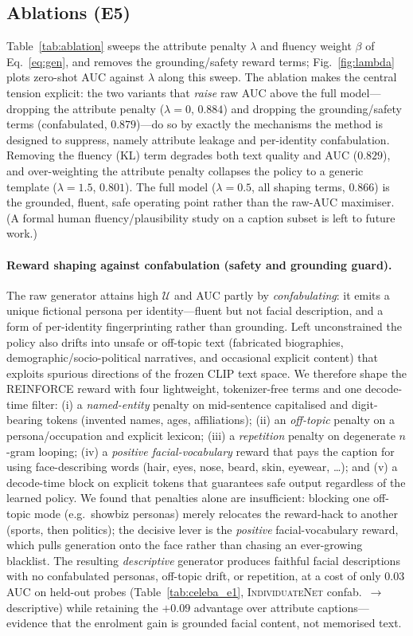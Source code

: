 \documentclass[10pt,twocolumn,letterpaper]{article}
\newcommand{\U}{\mathcal{U}}
\newcommand{\method}{\textsc{IndividuateNet}}
\begin{document}
\subsection{Ablations (E5)}
\label{sec:e5}
Table~\ref{tab:ablation} sweeps the attribute penalty $\lambda$ and fluency weight $\beta$ of
Eq.~\ref{eq:gen}, and removes the grounding/safety reward terms; Fig.~\ref{fig:lambda}
plots zero-shot AUC against $\lambda$ along this sweep. The ablation makes the central tension
explicit: the two variants that \emph{raise} raw AUC above the full model---dropping the
attribute penalty ($\lambda{=}0$, $0.884$) and dropping the grounding/safety terms
(confabulated, $0.879$)---do so by exactly the mechanisms the method is designed to suppress,
namely attribute leakage and per-identity confabulation. Removing the fluency (KL) term degrades
both text quality and AUC ($0.829$), and over-weighting the attribute penalty collapses the
policy to a generic template ($\lambda{=}1.5$, $0.801$). The full model ($\lambda{=}0.5$, all
shaping terms, $0.866$) is the grounded, fluent, safe operating point rather than the raw-AUC
maximiser. (A formal human fluency/plausibility study on a caption subset is left to future work.)

\paragraph{Reward shaping against confabulation (safety and grounding guard).}
The raw generator attains high $\U$ and AUC partly by \emph{confabulating}: it emits a unique
fictional persona per identity---fluent but not facial description, and a form of per-identity
fingerprinting rather than grounding. Left unconstrained the policy also drifts into unsafe or
off-topic text (fabricated biographies, demographic/socio-political narratives, and occasional
explicit content) that exploits spurious directions of the frozen CLIP text space. We therefore
shape the REINFORCE reward with four lightweight, tokenizer-free terms and one decode-time
filter: (i) a \emph{named-entity} penalty on mid-sentence capitalised and digit-bearing tokens
(invented names, ages, affiliations); (ii) an \emph{off-topic} penalty on a persona/occupation
and explicit lexicon; (iii) a \emph{repetition} penalty on degenerate $n$-gram looping; (iv) a
\emph{positive facial-vocabulary} reward that pays the caption for using face-describing words
(hair, eyes, nose, beard, skin, eyewear, \dots); and (v) a decode-time block on explicit tokens
that guarantees safe output regardless of the learned policy. We found that penalties alone are
insufficient: blocking one off-topic mode (e.g.\ showbiz personas) merely relocates the
reward-hack to another (sports, then politics); the decisive lever is the \emph{positive}
facial-vocabulary reward, which pulls generation onto the face rather than chasing an
ever-growing blacklist. The resulting \emph{descriptive} generator produces faithful facial
descriptions with no confabulated personas, off-topic drift, or repetition, at a cost of only
$0.03$ AUC on held-out probes (Table~\ref{tab:celeba_e1}, \method{} confab.\ $\to$
descriptive) while retaining the $+0.09$ advantage over attribute captions---evidence that the
enrolment gain is grounded facial content, not memorised text.
\end{document}
